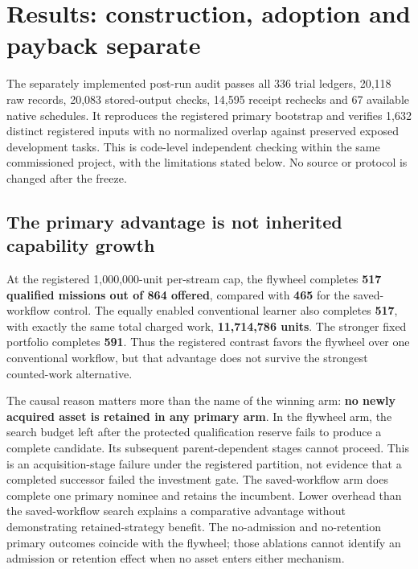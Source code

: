 \section{Results: construction, adoption and payback separate}

The separately implemented post-run audit passes all 336 trial ledgers, 20,118 raw records, 20,083 stored-output checks, 14,595 receipt rechecks and 67 available native schedules. It reproduces the registered primary bootstrap and verifies 1,632 distinct registered inputs with no normalized overlap against preserved exposed development tasks. This is code-level independent checking within the same commissioned project, with the limitations stated below. No source or protocol is changed after the freeze.

\subsection{The primary advantage is not inherited capability growth}

At the registered 1,000,000-unit per-stream cap, the flywheel completes \textbf{517 qualified missions out of 864 offered}, compared with \textbf{465} for the saved-workflow control. The equally enabled conventional learner also completes \textbf{517}, with exactly the same total charged work, \textbf{11,714,786 units}. The stronger fixed portfolio completes \textbf{591}. Thus the registered contrast favors the flywheel over one conventional workflow, but that advantage does not survive the strongest counted-work alternative.




The causal reason matters more than the name of the winning arm: \textbf{no newly acquired asset is retained in any primary arm}. In the flywheel arm, the search budget left after the protected qualification reserve fails to produce a complete candidate. Its subsequent parent-dependent stages cannot proceed. This is an acquisition-stage failure under the registered partition, not evidence that a completed successor failed the investment gate. The saved-workflow arm does complete one primary nominee and retains the incumbent. Lower overhead than the saved-workflow search explains a comparative advantage without demonstrating retained-strategy benefit. The no-admission and no-retention primary outcomes coincide with the flywheel; those ablations cannot identify an admission or retention effect when no asset enters either mechanism.

